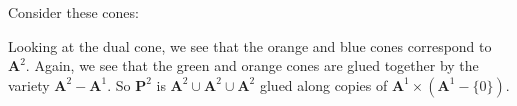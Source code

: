 \documentclass[11pt, oneside,margin=1in]{article}
\begin{document}
Consider these cones:
\begin{center}
\end{center}
Looking at the dual cone, we see that the orange and blue cones correspond to $\mathbf{A}^2$.  Again, we see that the green and orange cones are glued together by the variety $\mathbf{A}^2 - \mathbf{A}^1$. So $\mathbf{P}^2$ is $\mathbf{A}^2\cup \mathbf{A}^2\cup \mathbf{A}^2$ glued along copies of $\mathbf{A}^1\times (\mathbf{A}^1-\{0\})$.
\end{document}

